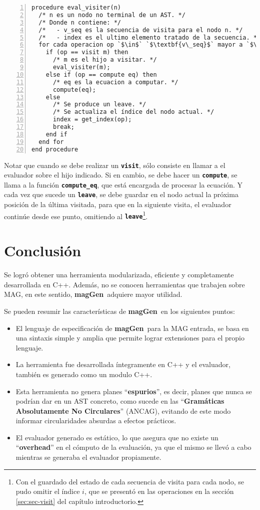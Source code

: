 \documentclass[runningheads,a4paper]{llncs}
\newcommand{\textbtt}[1]{\texttt{\textbf{#1}}}
\newcommand{\maggen}{\textbf{magGen}}
\begin{document}
\begin{lstlisting}[numbers=left]
procedure eval_visiter(n)
  /* n es un nodo no terminal de un AST. */
  /* Donde n contiene: */
  /*   - v_seq es la secuencia de visita para el nodo n. */
  /*   - index es el ultimo elemento tratado de la secuencia. */
  for cada operacion op `$\in$` `$\textbf{v\_seq}$` mayor a `$\textbf{index}$` do
    if (op == visit m) then
      /* m es el hijo a visitar. */
      eval_visiter(m);
    else if (op == compute eq) then
      /* eq es la ecuacion a computar. */
      compute(eq);
    else
      /* Se produce un leave. */
      /* Se actualiza el índice del nodo actual. */
      index = get_index(op);
      break;
    end if
  end for
end procedure
\end{lstlisting}

Notar que cuando se debe realizar un \textbtt{visit}, sólo consiste en llamar a el evaluador sobre el hijo indicado. Si en cambio, se debe hacer un \textbtt{compute}, se llama a la función \textbtt{compute\_eq}, que está encargada de procesar la ecuación. Y cada vez que sucede un \textbtt{leave}, se debe guardar en el nodo actual la próxima posición de la última visitada, para que en la siguiente visita, el evaluador continúe desde ese punto, omitiendo al \textbtt{leave}\footnote{Con el guardado del estado de cada secuencia de visita para cada nodo, se pudo omitir el índice $i$, que se presentó en las operaciones en la sección \ref{sec:sec-visit} del capítulo introductorio.}.

\section{Conclusión}

Se logró obtener una herramienta modularizada, eficiente y completamente desarrollada en C++. Además, no se conocen herramientas que trabajen sobre MAG, en este sentido, \maggen\ adquiere mayor utilidad. 

Se pueden resumir las características de \maggen\ en los siguientes puntos:

\begin{itemize}
\item El lenguaje de especificación de \maggen\ para la MAG entrada, se basa en una sintaxis simple y amplia que permite lograr extensiones para el propio lenguaje.

\item La herramienta fue desarrollada íntegramente en C++ y el evaluador, también es generado como un modulo C++. 

\item Esta herramienta no genera planes ``\textbf{espurios}'', es decir, planes que nunca se podrían dar en un AST concreto, como sucede en las ``\textbf{Gramáticas Absolutamente No Circulares}'' (ANCAG), evitando de este modo informar circularidades absurdas a efectos prácticos.

\item El evaluador generado es estático, lo que asegura que no existe un ``\textbf{overhead}'' en el cómputo de la evaluación, ya que el mismo se llevó a cabo mientras se generaba el evaluador propiamente.
\end{itemize}
\end{document}
